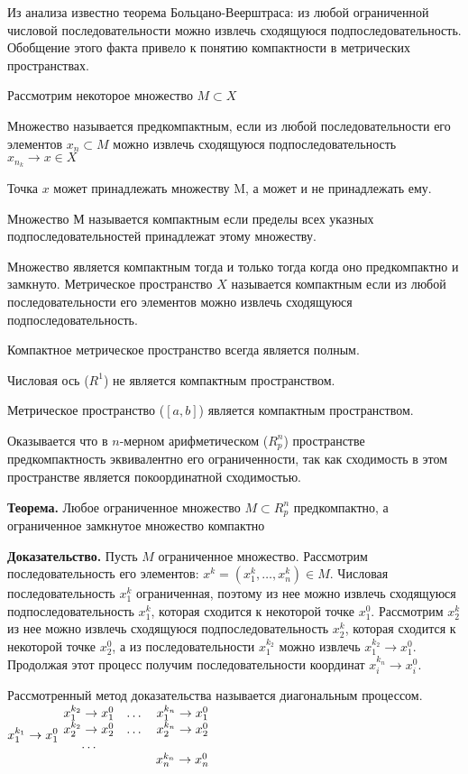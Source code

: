 \documentclass[12pt]{report}
\renewcommand{\[}{$\\\displaystyle}
\renewcommand{\]}{\\$}
\renewcommand{\[}{$\\\displaystyle}
\newcommand{\tth}[1][]{\textbf{Теорема#1.}}
\newcommand{\btev}[1][]{\textbf{Доказательство#1.}
}
\begin{document}
Из анализа известно теорема Больцано-Веерштраса: из любой ограниченной числовой последовательности можно извлечь сходящуюся подпоследовательность. Обобщение этого факта привело к понятию компактности в метрических пространствах.

Рассмотрим некоторое множество $M\subset X$

Множество называется предкомпактным, если из любой последовательности его элементов ${x_n}\subset M$ можно извлечь сходящуюся подпоследовательность $x_{n_k}\rightarrow x\in X$

Точка $x$ может принадлежать множеству M, а может и не принадлежать ему.

Множество $М$ называется компактным если пределы всех указных подпоследовательностей принадлежат этому множеству.

Множество является компактным тогда и только тогда когда оно предкомпактно и замкнуто. Метрическое пространство $X$ называется компактным если из любой последовательности его элементов можно извлечь сходящуюся подпоследовательность.

Компактное метрическое пространство всегда является полным.

Числовая ось ($R^1$) не является компактным пространством.

Метрическое пространство ($[a,b]$) является компактным пространством.

Оказывается что в $n$-мерном арифметическом ($R_p^n$) пространстве предкомпактность эквивалентно его ограниченности, так как сходимость в этом пространстве является покоординатной сходимостью.

\tth[] Любое ограниченное множество $M\subset R_p^n$ предкомпактно, а ограниченное замкнутое множество компактно

\btev[] Пусть $M$ ограниченное множество. Рассмотрим последовательность его элементов: $x^k=(x_1^k,\dots,x_n^k)\in M$.
Числовая последовательность $x_1^k$ ограниченная, поэтому из нее можно извлечь сходящуюся подпоследовательность $x_1^k$, которая сходится к некоторой точке $x_1^0$.
Рассмотрим $x_2^k$ из нее можно извлечь сходящуюся подпоследовательность $x_2^k$, которая сходится к некоторой точке $x_2^0$, а из последовательности $x_1^{k_2}$ можно извлечь $x_1^{k_2}\rightarrow x_1^0$. Продолжая этот процесс получим последовательности координат $x_i^{k_n}\rightarrow x_i^0$.

Рассмотренный метод доказательства называется диагональным процессом.
\[ x_1^{k_1} \rightarrow x_1^0 \]
\[
\begin{matrix}
x_1^{k_2} \rightarrow x_1^0 & \dots & x_1^{k_n} \rightarrow x_1^0 \\
x_2^{k_2} \rightarrow x_2^0 & \dots & x_2^{k_n} \rightarrow x_2^0 \\
\dots\\
& & x_n^{k_n} \rightarrow x_n^0 \\
\end{matrix}
\]
\end{document}
